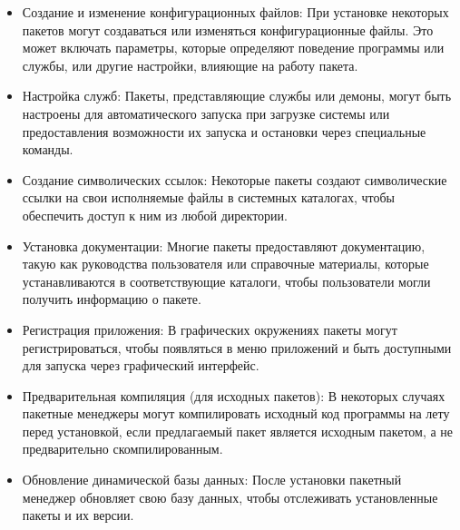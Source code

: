 \documentclass[oneside, final, 14pt]{extreport} %
\begin{document}
\begin{itemize}
    \item Создание и изменение конфигурационных файлов: При установке некоторых пакетов могут создаваться или изменяться конфигурационные файлы. Это может включать параметры, которые определяют поведение программы или службы, или другие настройки, влияющие на работу пакета.
    \item Настройка служб: Пакеты, представляющие службы или демоны, могут быть настроены для автоматического запуска при загрузке системы или предоставления возможности их запуска и остановки через специальные команды.
    \item Создание символических ссылок: Некоторые пакеты создают символические ссылки на свои исполняемые файлы в системных каталогах, чтобы обеспечить доступ к ним из любой директории.
    \item Установка документации: Многие пакеты предоставляют документацию, такую как руководства пользователя или справочные материалы, которые устанавливаются в соответствующие каталоги, чтобы пользователи могли получить информацию о пакете.
    \item Регистрация приложения: В графических окружениях пакеты могут регистрироваться, чтобы появляться в меню приложений и быть доступными для запуска через графический интерфейс.
    \item Предварительная компиляция (для исходных пакетов): В некоторых случаях пакетные менеджеры могут компилировать исходный код программы на лету перед установкой, если предлагаемый пакет является исходным пакетом, а не предварительно скомпилированным.
    \item Обновление динамической базы данных: После установки пакетный менеджер обновляет свою базу данных, чтобы отслеживать установленные пакеты и их версии.
\end{itemize}
\end{document}
